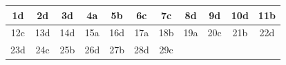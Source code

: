 \begin{table}[!ht]
\centering
\begin{tabular}{|c|c|c|c|c|c|c|c|c|c|c|}
\hline
1d & 2d & 3d & 4a & 5b & 6c & 7c & 8d & 9d & 10d & 11b \\ \hline
12c & 13d & 14d & 15a & 16d & 17a & 18b & 19a & 20c & 21b & 22d \\ \hline
23d & 24c & 25b & 26d & 27b & 28d & 29c & & & & \\ \hline
\end{tabular}
\end{table}
